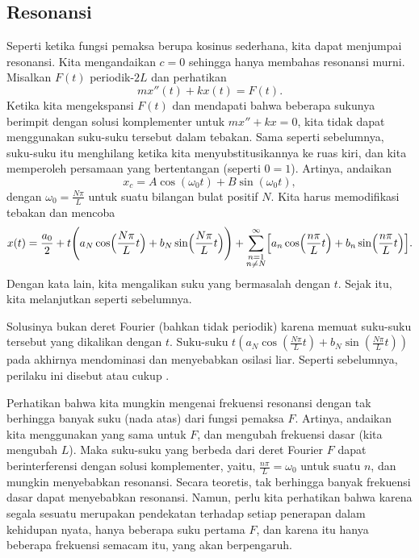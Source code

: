 \subsection{Resonansi}

Seperti ketika fungsi pemaksa berupa kosinus sederhana, kita dapat menjumpai
resonansi.  Kita mengandaikan $c=0$ sehingga hanya membahas resonansi murni.
Misalkan $F(t)$ periodik-$2L$ dan perhatikan
\begin{equation*}
m x''(t) + k x (t) = F(t) .
\end{equation*}
Ketika kita mengekspansi $F(t)$ dan mendapati bahwa beberapa sukunya berimpit dengan
solusi komplementer untuk $mx''+kx=0$, kita tidak dapat menggunakan suku-suku tersebut dalam
tebakan.  Sama seperti sebelumnya, suku-suku itu menghilang ketika kita menyubstitusikannya ke ruas kiri,
dan kita memperoleh persamaan yang bertentangan (seperti $0=1$).   Artinya,
andaikan
\begin{equation*}
x_c = A \cos (\omega_0 t) + B \sin (\omega_0 t), 
\end{equation*}
dengan $\omega_0 = \frac{N \pi}{L}$ untuk suatu bilangan bulat positif $N$.
Kita harus
memodifikasi tebakan dan mencoba
\begin{equation*}
x(t) = \frac{a_0}{2} +
t \Biggl(
a_N \cos \Bigl( \frac{N \pi}{L} t \Bigr) +
b_N \sin \Bigl( \frac{N \pi}{L} t \Bigr)
\Biggr) +
\sum_{\substack{n=1\\n \neq N}}^\infty
\Bigl[
a_n \cos \Bigl( \frac{n \pi}{L} t \Bigr) +
b_n \sin \Bigl( \frac{n \pi}{L} t \Bigr)
\Bigr].
\end{equation*}
Dengan kata lain, kita mengalikan suku yang bermasalah dengan $t$.  Sejak itu, kita
melanjutkan seperti sebelumnya.

Solusinya bukan deret Fourier (bahkan tidak
periodik) karena memuat suku-suku tersebut yang dikalikan dengan $t$.
Suku-suku
$t \left( a_N \cos \left( \frac{N \pi}{L} t \right) +
b_N \sin \left( \frac{N \pi}{L} t \right) \right)$ pada akhirnya mendominasi dan menyebabkan
osilasi liar.  Seperti sebelumnya, perilaku ini disebut \emph{} atau cukup \emph{}.

Perhatikan bahwa kita mungkin mengenai frekuensi resonansi dengan tak berhingga
banyak suku (nada atas) dari fungsi pemaksa $F$.
Artinya, andaikan kita menggunakan  yang sama untuk $F$, dan mengubah
frekuensi dasar (kita mengubah $L$).
Maka suku-suku yang berbeda
dari deret Fourier $F$ dapat berinterferensi dengan solusi komplementer,
yaitu, $\frac{n \pi}{L} = \omega_0$ untuk suatu $n$, dan mungkin
menyebabkan resonansi.
Secara teoretis, tak berhingga banyak frekuensi dasar
dapat menyebabkan resonansi.
Namun, perlu kita perhatikan bahwa karena segala sesuatu merupakan pendekatan terhadap
setiap penerapan dalam kehidupan nyata,
hanya beberapa
suku pertama $F$, dan karena itu hanya beberapa frekuensi semacam itu,
yang akan berpengaruh.

